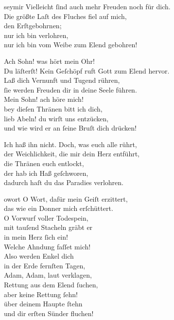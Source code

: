 \documentclass[tocstyle=ref-genre]{ees}
\begin{document}
{\begin{movement}{seymir}
  \voice[Kain]
  Vielleicht ſind auch mehr Freuden noch für dich.\\
  Die größte Laſt des Fluches fiel auf mich,\\
  den Erſtgebohrnen;\\
  nur ich bin verlohren,\\
  nur ich bin vom Weibe zum Elend gebohren!

  \voice[Adam]
  Ach Sohn! was hört mein Ohr!\\
  Du läſterſt! Kein Geſchöpf ruft Gott zum Elend hervor.\\
  Laß dich Vernunft und Tugend rühren,\\
  ſie werden Freuden dir in deine Seele führen.\\
  Mein Sohn! ach höre mich!\\
  bey dieſen Thränen bitt ich dich,\\
  lieb Abeln! du wirſt uns entzücken,\\
  und wie wird er an ſeine Bruſt dich drücken!

  \voice[Kain]
  Ich haß ihn nicht. Doch, was euch alle rührt,\\
  der Weichlichkeit, die mir dein Herz entführt,\\
  die Thränen euch entlockt,\\
  der hab ich Haß geſchworen,\\
  dadurch haſt du das Paradies verlohren.
\end{movement}

\begin{movement}{owort}
  \voice[Adam]
  O Wort, dafür mein Geiſt erzittert,\\
  das wie ein Donner mich erſchüttert.\\
  O Vorwurf voller Todespein,\\
  mit tauſend Stacheln gräbt er\\
  in mein Herz ſich ein!\\
  Welche Ahndung faſſet mich!\\
  Also werden Enkel dich\\
  in der Erde fernſten Tagen,\\
  Adam, Adam, laut verklagen,\\
  Rettung aus dem Elend ſuchen,\\
  aber keine Rettung ſehn!\\
  über deinem Haupte ſtehn\\
  und dir erſten Sünder fluchen!
\end{movement}

}
\end{document}
